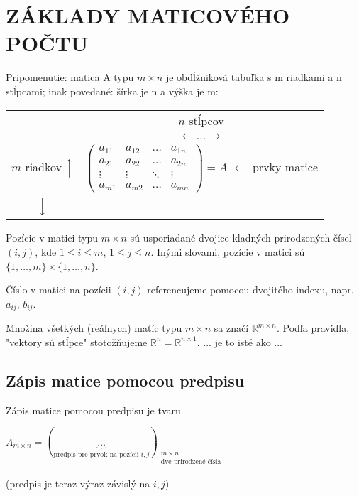 \documentclass[12pt, a4paper]{article}
\theoremstyle{definition}
\begin{document}
\section*{ZÁKLADY MATICOVÉHO POČTU}

Pripomenutie: matica A typu $m \times n$ je obdĺžniková tabuľka s m riadkami a n stĺpcami; inak povedané: šírka je n a výška je m:

\vspace{1em}
\begin{center}
\begin{tabular}{c c}
   & \hspace{-2em} $n$ stĺpcov \\
   & \hspace{-2em} $\longleftarrow \dots \longrightarrow$ \\
$m$ riadkov \quad $\Big\uparrow$ &
  $\begin{pmatrix}
    a_{11} & a_{12} & \dots & a_{1n} \\
    a_{21} & a_{22} & \dots & a_{2n} \\
    \vdots & \vdots & \ddots & \vdots \\
    a_{m1} & a_{m2} & \dots & a_{mn}
  \end{pmatrix} = A$ 
  \quad $\leftarrow$ prvky matice \\
  $\Big\downarrow$ &
\end{tabular}
\end{center}
\vspace{1em}

Pozície v matici typu $m \times n$ sú usporiadané dvojice kladných prirodzených čísel $(i, j)$, kde $1 \le i \le m$, $1 \le j \le n$. Inými slovami, pozície v matici sú $\{1, \dots, m\} \times \{1, \dots, n\}$.

Číslo v matici na pozícii $(i, j)$ referencujeme pomocou dvojitého indexu, napr. $a_{ij}$, $b_{ij}$.

Množina všetkých (reálnych) matíc typu $m \times n$ sa značí $\mathbb{R}^{m \times n}$. Podľa pravidla, "vektory sú stĺpce" stotožňujeme $\mathbb{R}^n = \mathbb{R}^{n \times 1}$.
... je to isté ako ...

\subsection*{Zápis matice pomocou predpisu}
Zápis matice pomocou predpisu je tvaru
\begin{center}
$A_{m \times n} = (\underbrace{\dots}_{\text{predpis pre prvok na pozícii } i,j})_{\substack{m \times n \\ \text{dve prirodzené čísla}}}$
\end{center}
(predpis je teraz výraz závislý na $i, j$)
\end{document}
